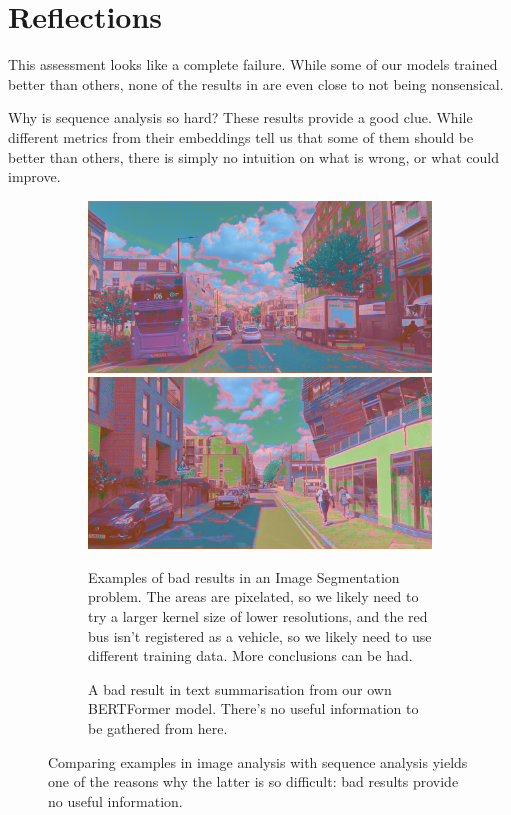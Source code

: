 \section{Reflections}
\label{reflections_section}

This assessment looks like a complete failure.
While some of our models trained better than others, none of the results in \appendixA{} are even close to not being nonsensical.

Why is sequence analysis so hard? These results provide a good clue.
While different metrics from their embeddings tell us that some of them should be better than others, there is simply no intuition on what is wrong, or what could improve.

\begin{figure}[h]
	\begin{subfigure}[][265pt][t]{.48\textwidth}
		\includegraphics[width=\textwidth]{bad_convolutional_result.png}
		\includegraphics[width=\textwidth]{bad_convolutional_result_2.png}
		\caption{Examples of bad results in an Image Segmentation problem. The areas are pixelated, so we likely need to try a larger kernel size of lower resolutions, and the red bus isn't registered as a vehicle, so we likely need to use different training data. More conclusions can be had.} 
	\end{subfigure}\hfill{}%
	\begin{subfigure}[][265pt][t]{.48\textwidth}
		
		\caption{A bad result in text summarisation from our own BERTFormer model. There's no useful information to be gathered from here.}
	\end{subfigure}
	\caption{Comparing examples in image analysis with sequence analysis yields one of the reasons why the latter is so difficult: bad results provide no useful information.}
\end{figure}

